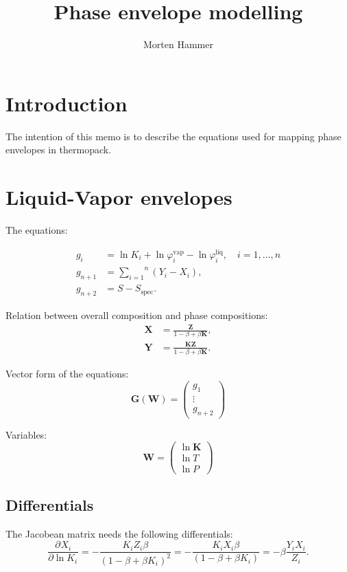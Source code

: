 \documentclass[internal,english]{sintefmemo2012}
\title{Phase envelope modelling}
\author{Morten Hammer}
\newcommand*{\pd}[3][]{\frac{\partial^{#1}#2}{\partial{#3}^{#1}}}%
\newcommand*{\vektor}[1]{\boldsymbol{#1}}%
\newcommand{\spec}{\text{spec}}
\newcommand{\liq}{\text{liq}}
\newcommand{\vap}{\text{vap}}
\begin{document}
\frontmatter
\tableofcontents
\section{Introduction}
The intention of this memo is to describe the equations used for mapping phase envelopes in thermopack.


\section{Liquid-Vapor envelopes}

The equations:

\begin{align}
   g_i &= \ln K_i + \ln \varphi^\vap_i - \ln \varphi^\liq_i , \quad
   i=1,\dots,n \label{eq:fug_eq}\\
   g_{n+1} &= \overset{n}{\underset{i=1}{\sum}}\left(Y_i-X_i\right), \label{eq:sum_eq} \\
   g_{n+2} &= S - S_\spec \label{eq:spec_eq}.
\end{align}

Relation between overall composition and phase compositions:
\begin{align}
  \label{eq:comp1}
  \vektor{X} &= \frac{\vektor{Z}}{1-\beta+\beta \vektor{K}},\\
  \label{eq:comp2}
  \vektor{Y} &= \frac{\vektor{K}\vektor{Z}}{1-\beta+\beta \vektor{K}}.
\end{align}

Vector form of the equations:
\begin{equation}
  \label{eq:G}
  \vektor{G}\left(\vektor{W}\right) = \begin{pmatrix}
    g_1 \\
    \vdots \\
    g_{n+2}
  \end{pmatrix}
\end{equation}

Variables:
\begin{equation}
  \label{eq:W}
  \vektor{W} = \begin{pmatrix}
    \ln \vektor{K} \\
    \ln T \\
    \ln P
  \end{pmatrix}
\end{equation}
\subsection{Differentials}
The Jacobean matrix needs the following differentials:
\begin{equation}
   \pd{X_i}{\ln K_i} = -\frac{K_iZ_i\beta}{\left(1-\beta+\beta K_i\right)^2} = -\frac{K_iX_i\beta}{\left(1-\beta+\beta K_i\right)} = -\beta\frac{Y_iX_i}{Z_i}.
\end{equation}
\end{document}
